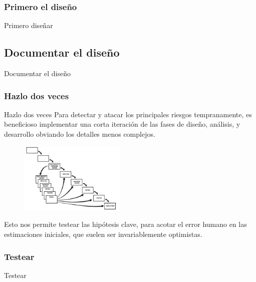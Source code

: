\documentclass{beamer}
\begin{document}
\subsubsection{Primero el diseño}

\begin{frame}{Primero diseñar}

\end{frame}

\subsection{Documentar el diseño}

\begin{frame}{Documentar el diseño}

\end{frame}

\subsubsection{Hazlo dos veces}
\begin{frame}{Hazlo dos veces}
Para detectar y atacar los principales riesgos tempranamente, es beneficioso implementar una corta iteración de las fases de diseño, análisis, y desarrollo obviando los detalles menos complejos.

\begin{figure}
\includegraphics[width=0.45\textwidth]{figures/hazloDosVeces.png}
\end{figure}

Esto nos permite testear las hipótesis clave, para acotar el error humano en las estimaciones iniciales, que suelen ser invariablemente optimistas.



\end{frame}

\subsubsection{Testear}

\begin{frame}{Testear}

\end{frame}
\end{document}
